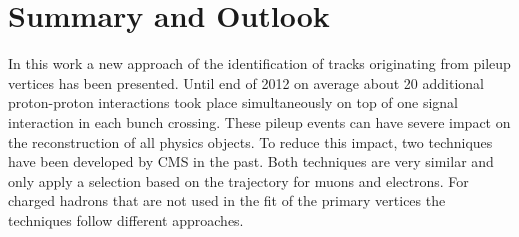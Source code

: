 \chapter{Summary and Outlook \label{sec:SandO}}

In this work a new approach of the identification of tracks originating from pileup vertices has been presented. Until end of 2012 on average about 20 additional proton-proton interactions took place simultaneously on top of one signal interaction in each bunch crossing. These pileup events can have severe impact on the reconstruction of all physics objects. To reduce this impact, two techniques have been developed by CMS in the past. Both techniques are very similar and only apply a selection based on the trajectory for muons and electrons. For charged hadrons that are not used in the fit of the primary vertices the techniques follow different approaches.

